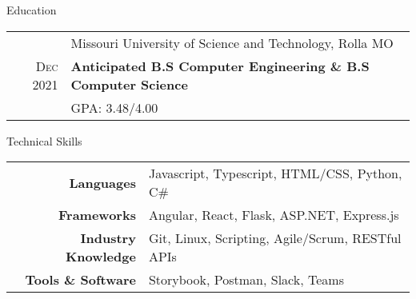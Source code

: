 \documentclass{resume}
\begin{document}
    
\begin{rSection}{Education}
    \small {
    \begin{tabular}{r|p{15cm}}
       & Missouri University of Science and Technology, Rolla MO  \\ 
      \textsc{Dec} 2021 & \textbf{Anticipated B.S Computer Engineering \& B.S Computer Science} \\
      & GPA: 3.48/4.00 \\
    \end{tabular}
    }
\end{rSection}
      
\begin{rSection}{Technical Skills}
  \small
  {
      \begin{tabular}{rl}
      \multicolumn{1}{r|}{\textbf{Languages}} & Javascript, Typescript, HTML/CSS, Python, C\# \\
      \multicolumn{1}{r|}{\textbf{Frameworks}} & Angular, React, Flask, ASP.NET, Express.js \\
      \multicolumn{1}{r|}{\textbf{Industry Knowledge}} & Git, Linux, Scripting, Agile/Scrum, RESTful APIs \\
      \multicolumn{1}{r|}{\textbf{Tools \& Software}} & Storybook, Postman, Slack, Teams
      \end{tabular}
  }
\end{rSection}
\end{document}
